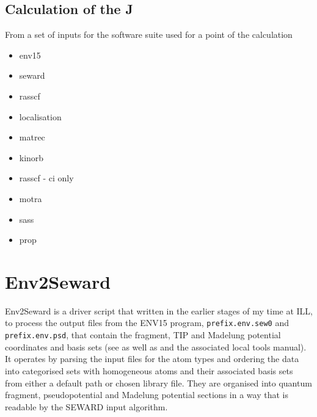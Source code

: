\documentclass[10pt]{article}
\begin{document}
\subsection{Calculation of the J}

From a set of inputs for the software suite used for a point of the calculation
\begin{itemize}
	\item env15
	\item seward
	\item rasscf
	\item localisation
	\item matrec
	\item kinorb
	\item rasscf - ci only
	\item motra
	\item sass
	\item prop
\end{itemize}

\section{Env2Seward}
Env2Seward is a driver script that written in the earlier stages of my time at ILL, to process the output files from the ENV15 program, \texttt{prefix.env.sew0} and \texttt{prefix.env.psd}, that contain the fragment, TIP and Madelung potential coordinates and basis sets (see \cite{varignon2013ab} as well as \cite{gelle2008fast} and the associated local tools manual). It operates by parsing the input files for the atom types and ordering the data into categorised sets with homogeneous atoms and their associated basis sets from either a default path or chosen library file. They are organised into quantum fragment, pseudopotential and Madelung potential sections in a way that is readable by the SEWARD input algorithm.



\end{document}

